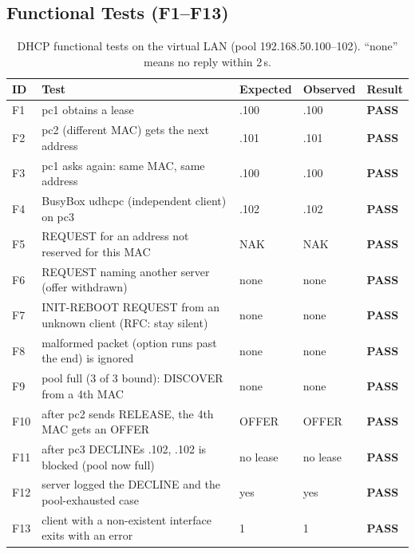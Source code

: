 \documentclass[11pt]{article}
\begin{document}
\subsection{Functional Tests (F1--F13)}
\begin{table}[H]
\centering
\small
\begin{tabular}{lp{8.3cm}lll}
\toprule
\textbf{ID} & \textbf{Test} & \textbf{Expected} & \textbf{Observed} & \textbf{Result} \\
\midrule
F1 & pc1 obtains a lease & .100 & .100 & \textbf{PASS} \\
F2 & pc2 (different MAC) gets the next address & .101 & .101 & \textbf{PASS} \\
F3 & pc1 asks again: same MAC, same address & .100 & .100 & \textbf{PASS} \\
F4 & BusyBox udhcpc (independent client) on pc3 & .102 & .102 & \textbf{PASS} \\
F5 & REQUEST for an address not reserved for this MAC & NAK & NAK & \textbf{PASS} \\
F6 & REQUEST naming another server (offer withdrawn) & none & none & \textbf{PASS} \\
F7 & INIT-REBOOT REQUEST from an unknown client (RFC: stay silent) & none & none & \textbf{PASS} \\
F8 & malformed packet (option runs past the end) is ignored & none & none & \textbf{PASS} \\
F9 & pool full (3 of 3 bound): DISCOVER from a 4th MAC & none & none & \textbf{PASS} \\
F10 & after pc2 sends RELEASE, the 4th MAC gets an OFFER & OFFER & OFFER & \textbf{PASS} \\
F11 & after pc3 DECLINEs .102, .102 is blocked (pool now full) & no lease & no lease & \textbf{PASS} \\
F12 & server logged the DECLINE and the pool-exhausted case & yes & yes & \textbf{PASS} \\
F13 & client with a non-existent interface exits with an error & 1 & 1 & \textbf{PASS} \\
\bottomrule
\end{tabular}
\caption{DHCP functional tests on the virtual LAN (pool 192.168.50.100--102). ``none''
means no reply within 2\,s.}
\label{tab:functional}
\end{table}
\end{document}
